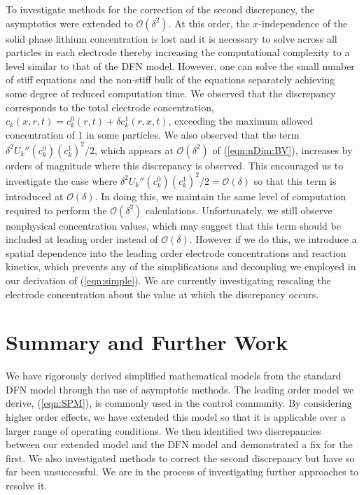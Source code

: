 \documentclass[preprint]{elsarticle}
\begin{document}
To investigate methods for the correction of the second discrepancy, the asymptotics were extended to $\mathcal{O}(\delta^2)$. At this order, the $x$-independence of the solid phase lithium concentration is lost and it is necessary to solve across all particles in each electrode thereby increasing the computational complexity to a level similar to that of the DFN model. However, one can solve the small number of stiff equations and the non-stiff bulk of the equations separately achieving some degree of reduced computation time. We observed that the discrepancy corresponds to the total electrode concentration, $c_k(x,r,t) = c_k^0(r,t) + \delta c_k^1(r,x,t)$, exceeding the maximum allowed concentration of $1$ in some particles. We also observed that the term $\delta^2 U_k''(c_k^0) (c_k^1)^2 / 2$, which appears at $\mathcal{O}(\delta^2)$ of (\ref{eqn:nDim:BV}), increases by orders of magnitude where this discrepancy is observed. This encouraged us to investigate the case where $\delta^2 U_k''(c_k^0) (c_k^1)^2 / 2=\mathcal{O}(\delta)$ so that this term is introduced at $\mathcal{O}(\delta)$. In doing this, we maintain the same level of computation required to perform the $\mathcal{O}(\delta^2)$ calculations. Unfortunately, we still observe nonphysical concentration values, which may suggest that this term should be included at leading order instead of $\mathcal{O}(\delta)$. However if we do this, we introduce a spatial dependence into the leading order electrode concentrations and reaction kinetics, which prevents any of the simplifications and decoupling we employed in our derivation of (\ref{eqn:simple}). We are currently investigating rescaling the electrode concentration about the value at which the discrepancy occurs. 


\section{Summary and Further Work} 
We have rigorously derived simplified mathematical models from the standard DFN model through the use of asymptotic methods. The leading order model we derive, (\ref{eqn:SPM}), is commonly used in the control community. By considering higher order effects, we have extended this model so that it is applicable over a larger range of operating conditions. We then identified two discrepancies between our extended model and the DFN model and demonstrated a fix for the first. We also investigated methods to correct the second discrepancy but have so far been unsuccessful. We are in the process of investigating further approaches to resolve it. \\ 
\end{document}
